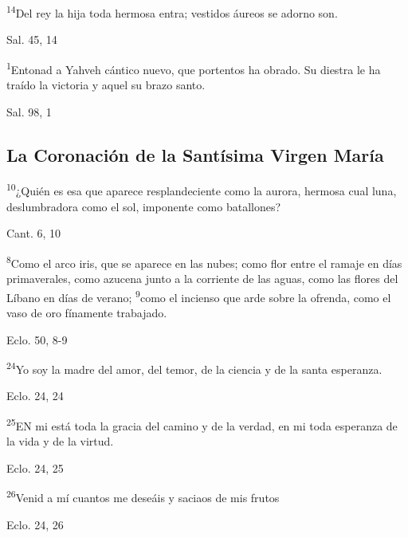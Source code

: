 \documentclass[a4paper,11pt]{article}
\begin{document}
      \textsuperscript{14}Del rey la hija toda hermosa entra; vestidos áureos se adorno son.
      \begin{flushright}
        Sal. 45, 14
      \end{flushright}

      \textsuperscript{1}Entonad a Yahveh cántico nuevo, que portentos ha obrado. Su diestra le ha traído la victoria y aquel su brazo santo.
      \begin{flushright}
        Sal. 98, 1
      \end{flushright}
    \subsection*{\hfil La Coronación de la Santísima Virgen María \hfil}

      \textsuperscript{10}¿Quién es esa que aparece resplandeciente como la aurora,
      hermosa cual luna, deslumbradora como el sol, imponente como batallones?
      \begin{flushright}
        Cant. 6, 10
      \end{flushright}

      \textsuperscript{8}Como el arco iris, que se aparece en las nubes; como flor entre el ramaje en días primaverales, como azucena junto
      a la corriente de las aguas, como las flores del Líbano en días de verano; \textsuperscript{9}como el incienso que arde sobre la ofrenda,
      como el vaso de oro fínamente trabajado.
      \begin{flushright}
        Eclo. 50, 8-9
      \end{flushright}

      \textsuperscript{24}Yo soy la madre del amor, del temor, de la ciencia y de la santa esperanza.
      \begin{flushright}
        Eclo. 24, 24
      \end{flushright}

      \textsuperscript{25}EN mi está toda la gracia del camino y de la verdad, en mi toda esperanza de la vida y de la virtud.
      \begin{flushright}
        Eclo. 24, 25
      \end{flushright}

      \textsuperscript{26}Venid a mí cuantos me deseáis y saciaos de mis frutos
      \begin{flushright}
        Eclo. 24, 26
      \end{flushright}
\end{document}
